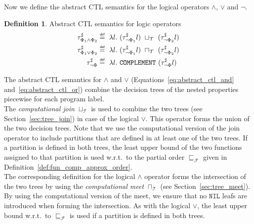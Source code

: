 \documentclass[11pt,a4paper,titlepage]{article}
\theoremstyle{definition}
\newtheorem{definition}{Definition}[section]
\newcommand\eqdef{\mathrel{\overset{\makebox[0pt]{\mbox{\normalfont\tiny\sffamily def}}}{=}}}
\begin{document}
Now we define the abstract CTL semantics for the logical operators $\land$, $\lor$ and $\neg$.

\begin{definition}\label{def:abstract_ctl_semantics_logic_operators}
    Abstract CTL semantics for logic operators
    \begin{align}
        \tau^{\sharp}_{\Phi_1 \land \Phi_2} &\eqdef \ \lambda l. \ (\tau^{\sharp}_{\neg \Phi_1}l) \ \sqcup_{\mathcal{T}} \ (\tau^{\sharp}_{\neg \Phi_2}l)
        \label{eq:abstract_ctl_and}\\
        \tau^{\sharp}_{\Phi_1 \lor \Phi_2} &\eqdef \ \lambda l. \ (\tau^{\sharp}_{\neg \Phi_1}l) \ \sqcap_{\mathcal{T}} \ (\tau^{\sharp}_{\neg \Phi_2}l)
        \label{eq:abstract_ctl_or}\\
        \tau^{\sharp}_{\neg \Phi} &\eqdef \ \lambda l. \ \mathtt{COMPLEMENT} \ (\tau^{\sharp}_{\neg \Phi}l)
        \label{eq:abstract_ctl_not}
    \end{align}
\end{definition}

The abstract CTL semantics for $\land$ and $\lor$ (Equations~\ref{eq:abstract_ctl_and} and~\ref{eq:abstract_ctl_or}) combine the decision trees
of the nested properties piecewise for each program label.\\

The \textit{computational join} $\sqcup_{\mathcal{T}}$ is used to combine the two trees (see Section~\ref{sec:tree_join}) in
case of the logical $\lor$. This operator forms the union of the two decision trees. 
Note that we use the computational version of the join operator to include partitions that are defined in at least one of the two trees. 
If a partition is defined in both trees, the least upper bound of the two functions assigned to that partition is used w.r.t.\ to the 
partial order $\sqsubseteq_{\mathcal{F}}$ given in Definition~\ref{def:fun_comp_approx_order}.\\

The corresponding definition for the logical $\land$ operator forms the intersection of the two trees by using the
\textit{computational meet} $\sqcap_{\mathcal{T}}$ (see Section~\ref{sec:tree_meet}). 
By using the computational version of the meet, we ensure that no $\mathtt{NIL}$ leafs are introduced when forming the intersection.
As with the logical $\lor$, the least upper bound w.r.t.\ to $\sqsubseteq_{\mathcal{F}}$ is used if a partition is defined in both trees.\\
\end{document}
